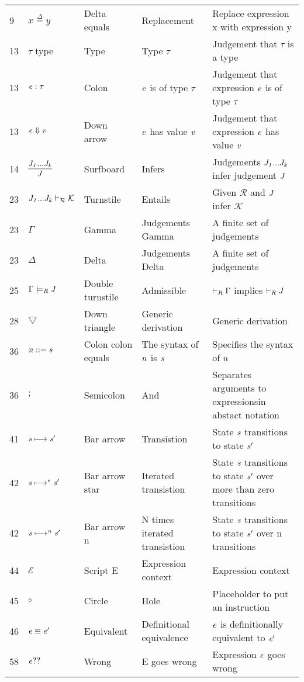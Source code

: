 \documentclass[12pt]{article}
\begin{document}
\begin{tabular}[b] {p{} p{} p{} p{} p{}}
9& $x \overset{\Delta}{=} y$ & Delta equals & Replacement & Replace expression x with expression y \\
13& $\tau$ type& Type & Type $\tau$ & Judgement that $\tau$ is a type \\
13& $\it{e} : \tau$ & Colon &  $\it{e}$ is of type $\tau$ & Judgement that expression $\it{e}$ is of type $\tau$ \\
13& $\it{e} \Downarrow \it{v}$ & Down arrow &  $\it{e}$ has value $\it{v} $ & Judgement that expression $\it{e}$ has value $\it{v} $\\
14& $\infer {\it{J}} {\it{J}_{1}...\it{J}_{\it{k}}}$  & Surfboard & Infers & Judgements ${\it{J}_{1}...\it{J}_{\it{k}}}$ infer judgement ${\it{J}}$\\
23 & ${\it{J}_{1}...\it{J}_{\it{k}}} \vdash_{\mathcal{R}} \mathcal{K}$ & Turnstile & Entails & Given $\mathcal{R}$ and $\it{J}$ infer $\mathcal{K}$\\
23 & $\Gamma$ & Gamma & Judgements Gamma & A finite set of judgements \\
23 & $\Delta$ & Delta & Judgements Delta & A finite set of judgements \\
25 & $\Gamma \models_{\it{R}} \it{J}$ & Double turnstile & Admissible & $\vdash_{\it{R}} \Gamma$ implies $\vdash_{\it{R}} \it{J}$ \\
28 & $\bigtriangledown$ & Down triangle & Generic derivation & Generic derivation \\
36 & $ \it{n} ::= \it{s} $ & Colon colon equals & The syntax of $\it{n}$ is $\it{s}$ & Specifies the syntax of $\it{n}$ \\
36 & $;$ & Semicolon & And & Separates arguments to expressionsin abstact notation\\

41 & $\it{s} \longmapsto \it{s'}$ & Bar arrow & Transistion  & State $\it{s}$ transitions to state $\it{s'}$ \\

42 & $\it{s} \longmapsto ^{*} \it{s'}$ & Bar arrow star & Iterated transistion  & State $\it{s}$ transitions to state $\it{s'}$ over more than zero transitions \\

42 & $\it{s} \longmapsto ^{n} \it{s'}$ & Bar arrow n & N times iterated transistion  & State $\it{s}$ transitions to state $\it{s'}$ over n transitions \\

44 & $\mathcal{E}$  & Script E & Expression context & Expression context \\

45 & $\circ $ & Circle & Hole & Placeholder to put an instruction \\
46 & $ \it{e} \equiv \it{e}' $ & Equivalent & Definitional equivalence & $\it{e}$ is definitionally equivalent to $\it{e}'$ \\

58 & $\it{e}??$ & Wrong & E goes wrong & Expression $\it{e}$ goes wrong \\

\end{tabular}
\newpage
\end{document}
